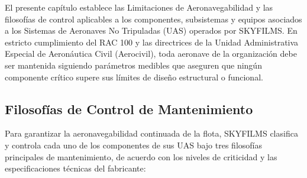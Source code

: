 
El presente capítulo establece las Limitaciones de Aeronavegabilidad y las filosofías de control aplicables a los componentes, subsistemas y equipos asociados a los Sistemas de Aeronaves No Tripuladas (UAS) operados por SKYFILMS. En estricto cumplimiento del RAC 100 y las directrices de la Unidad Administrativa Especial de Aeronáutica Civil (Aerocivil), toda aeronave de la organización debe ser mantenida siguiendo parámetros medibles que aseguren que ningún componente crítico supere sus límites de diseño estructural o funcional.

\subsection{Filosofías de Control de Mantenimiento}
Para garantizar la aeronavegabilidad continuada de la flota, SKYFILMS clasifica y controla cada uno de los componentes de sus UAS bajo tres filosofías principales de mantenimiento, de acuerdo con los niveles de criticidad y las especificaciones técnicas del fabricante:


